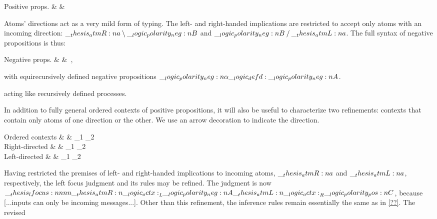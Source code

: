 \begin{syntax*}
  Positive props. &
     &  \mid {} \mid {} \fuse {} \mid \one \mid \dn {}
\end{syntax*}

Atoms' directions act as a very mild form of typing.
The left- and right-handed implications are restricted to accept only atoms with an incoming direction: $\__thesis_atmR:n {a} \mathbin { \setminus } \__logic_polarity_neg:n {B}$ and $\__logic_polarity_neg:n {B} \mathbin { / } \__thesis_atmL:n {a}$.
The full syntax of negative propositions is thus:
\begin{syntax*}
  Negative props. &
     & \n{\alpha} \mid {} \limp {} \mid {} \pmir {} \mid {} \with {} \mid \top \mid \up {}
  \,,
\end{syntax*}
with equirecursively defined negative propositions $\__logic_polarity_neg:n {\alpha} \__logic_defd: \__logic_polarity_neg:n {A}$.


 acting like recursively defined processes.

In addition to fully general ordered contexts of positive propositions, it will also be useful to characterize two refinements: contexts that contain only atoms of one direction or the other.
We use an arrow decoration to indicate the direction.
\begin{syntax*}
  Ordered contexts &
    \octx & \octx_1 \oc \octx_2 \mid \octxe \mid {}
  \\[-2\jot]
  Right-directed &
    \atmR{\octx} & \atmR{\octx}_1 \oc \atmR{\octx}_2 \mid \octxe \mid {}
  \\[-2\jot]
  Left-directed &
    \atmL{\octx} & \atmL{\octx}_1 \oc \atmL{\octx}_2 \mid \octxe \mid {}
\end{syntax*}

Having restricted the premises of left- and right-handed implications to incoming atoms, $\__thesis_atmR:n {a}$ and $\__thesis_atmL:n {a}$, respectively, the left focus judgment and its rules may be refined.
The judgment is now $\__thesis_lfocus:nnnn {\__thesis_atmR:n {\__logic_octx:}_L} {\__logic_polarity_neg:n {A}} {\__thesis_atmL:n {\__logic_octx:}_R} {\__logic_polarity_pos:n {C}}$, because [...inputs can only be incoming messages...].
Other than this refinement, the inference rules remain essentially the same as in \cref{??}.
The revised 


